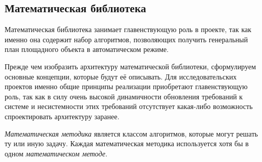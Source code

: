 \subsection{\large{Математическая библиотека}}

Математическая библиотека занимает главенствующую роль в проекте, так как именно она содержит
набор алгоритмов, позволяющих получить генеральный план площадного объекта в автоматическом режиме.

Прежде чем изобразить архитектуру математической библиотеки, сформулируем основные концепции,
которые будут её описывать.
Для исследовательских проектов именно общие принципы реализации
приобретают главенствующую роль, так как в силу очень высокой динамичности обновления требований к системе
и несистемности этих требований отсутствует какая-либо возможность спроектировать архитектуру заранее.

\textit{Математическая методика} является классом алгоритмов, которые могут решать ту или иную задачу.
Каждая математическая методика используется хотя бы в одном \textit{математическом методе}.

